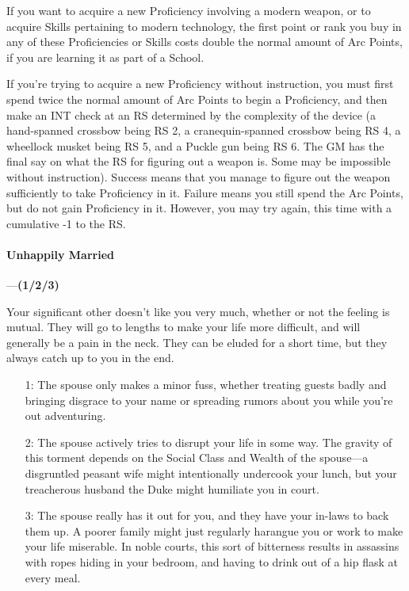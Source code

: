 \documentclass[oneside,11pt,english]{book}
\begin{document}
If you want to acquire a new Proficiency involving a modern weapon, or to acquire Skills pertaining to 
modern technology, the first point or rank you buy in any of these Proficiencies or Skills costs double the 
normal amount of Arc Points, if you are learning it as part of a School. 


If you’re trying to acquire a new Proficiency without instruction, you must first spend twice the normal 
amount of Arc Points to begin a Proficiency, and then make an INT check at an RS determined by the 
complexity of the device (a hand-spanned crossbow being RS 2, a cranequin-spanned crossbow being RS 
4, a wheellock musket being RS 5, and a Puckle gun being RS 6. The GM has the final say on what the 
RS for figuring out a weapon is. Some may be impossible without instruction). Success means that you manage to figure out the weapon sufficiently to take Proficiency in it. Failure means you still spend the Arc Points, but do not gain Proficiency in it. However, you may try again, this time with a cumulative -1 to the RS.
\paragraph{\label{bane:Unhappily Married}Unhappily Married}---\quad\textbf{(1/2/3) }\par
Your significant other doesn’t like you very much, whether or not the feeling is mutual. They will go to lengths to make your life more difficult, and will generally be a pain in the neck. They can be eluded for a short time, but they always catch up to you in the end.
\begin{itemize}
	\item [1:] The spouse only makes a minor fuss, whether treating guests badly and bringing disgrace to your name or spreading rumors about you while you’re out adventuring. 
	\item [2:] The spouse actively tries to disrupt your life in some way. The gravity of this torment depends on the Social Class and Wealth of the spouse—a disgruntled peasant wife might intentionally undercook your lunch, but your treacherous husband the Duke might humiliate you in court. 
	\item [3:] The spouse really has it out for you, and they have your in-laws to back them up. A poorer family might just regularly harangue you or work to make your life miserable. In noble courts, this sort of bitterness results in assassins with ropes hiding in your bedroom, and having to drink out of a hip flask at every meal.
\end{itemize}
\end{document}
